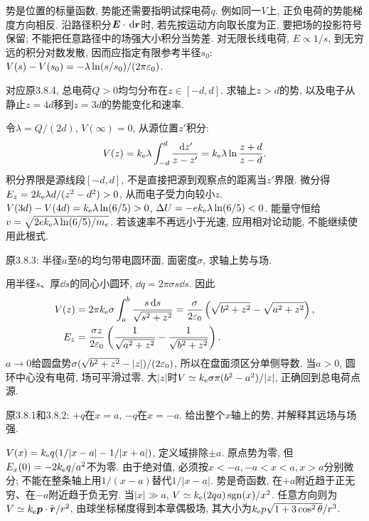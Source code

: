 \label{tb:potentialexamples}
势是位置的标量函数, 势能还需要指明试探电荷$q$. 例如同一$V$上, 正负电荷的势能梯度方向相反. 沿路径积分$\boldsymbol{E}\cdot\,\mathrm d\boldsymbol{r}$时, 若先按运动方向取长度为正, 要把场的投影符号保留; 不能把任意路径中的场强大小积分当势差. 对无限长线电荷, $E\propto1/s$, 到无穷远的积分对数发散, 因而应指定有限参考半径$s_0$:
$V(s)-V(s_0)=-\lambda\ln(s/s_0)/(2\pi\varepsilon_0)$.

\begin{example}\label{ex:rodpotential}
对应原3.8.4, 总电荷$Q>0$均匀分布在$z\in[-d,d]$. 求轴上$z>d$的势, 以及电子从静止$z=4d$移到$z=3d$的势能变化和速率.
\end{example}
\begin{solution}
令$\lambda=Q/(2d)$, $V(\infty)=0$, 从源位置$z'$积分:
\[
V(z)=k_{\mathrm e}\lambda\int_{-d}^d\frac{\,\mathrm d z'}{z-z'}
=k_{\mathrm e}\lambda\ln\frac{z+d}{z-d}.
\]
积分界限是源线段$[-d,d]$, 不是直接把源到观察点的距离当$z'$界限. 微分得$E_z=2k_{\mathrm e}\lambda d/(z^2-d^2)>0$, 从而电子受力向较小$z$.
$V(3d)-V(4d)=k_{\mathrm e}\lambda\ln(6/5)>0$, $\Delta U=-ek_{\mathrm e}\lambda\ln(6/5)<0$. 能量守恒给$v=\sqrt{2ek_{\mathrm e}\lambda\ln(6/5)/m_e}$. 若该速率不再远小于光速, 应用相对论动能, 不能继续使用此根式.
\end{solution}

\begin{example}\label{ex:annulus}
原3.8.3: 半径$a$至$b$的均匀带电圆环面, 面密度$\sigma$, 求轴上势与场.
\end{example}
\begin{solution}
用半径$s$、厚$\dd s$的同心小圆环, $\dd q=2\pi\sigma s\dd s$. 因此
\begin{align*}
V(z)&=2\pi k_{\mathrm e}\sigma\int_a^b\frac{s\,\mathrm d s}{\sqrt{s^2+z^2}}
=\frac\sigma{2\varepsilon_0}\left(\sqrt{b^2+z^2}-\sqrt{a^2+z^2}\right),\\
E_z&=\frac{\sigma z}{2\varepsilon_0}\left(\frac1{\sqrt{a^2+z^2}}-\frac1{\sqrt{b^2+z^2}}\right).
\end{align*}
$a\to0$给圆盘势$\sigma(\sqrt{b^2+z^2}-|z|)/(2\varepsilon_0)$, 所以在盘面须区分单侧导数. 当$a>0$, 圆环中心没有电荷, 场可平滑过零. 大$|z|$时$V\simeq k_{\mathrm e}\sigma\pi(b^2-a^2)/|z|$, 正确回到总电荷点源.
\end{solution}

\begin{example}\label{ex:dipoleaxis}
原3.8.1和3.8.2: $+q$在$x=a$, $-q$在$x=-a$. 给出整个$x$轴上的势, 并解释其远场与场强.
\end{example}
\begin{solution}
$V(x)=k_{\mathrm e} q(1/|x-a|-1/|x+a|)$, 定义域排除$\pm a$. 原点势为零, 但$E_x(0)=-2k_{\mathrm e} q/a^2$不为零. 由于绝对值, 必须按$x<-a,-a<x<a,x>a$分别微分; 不能在整条轴上用$1/(x-a)$替代$1/|x-a|$. 势是奇函数, 在$+a$附近趋于正无穷、在$-a$附近趋于负无穷. 当$|x|\gg a$, $V\simeq k_{\mathrm e}(2qa)\operatorname{sgn}(x)/x^2$. 任意方向则为$V\simeq k_{\mathrm e}\boldsymbol{p}\cdot\hat{\boldsymbol{r}}/r^2$, 由球坐标梯度得到本章偶极场, 其大小为$k_{\mathrm e} p\sqrt{1+3\cos^2\theta}/r^3$.
\end{solution}

